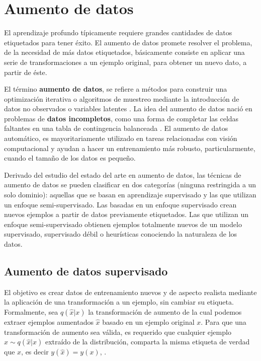 
\section{Aumento de datos}

El aprendizaje profundo típicamente requiere grandes cantidades de datos etiquetados para tener éxito. El aumento de datos promete resolver el problema, de la necesidad de más datos etiquetados, básicamente consiste en aplicar una serie de transformaciones a un ejemplo original, para obtener un nuevo dato, a partir de éste.

El término \textbf{aumento de datos}, se refiere a métodos para construir una optimización iterativa o algoritmos de muestreo mediante la introducción de datos no observados o variables latentes \citep{van2001art}. La idea del aumento de datos nació en problemas de \textbf{datos incompletos}, como una forma de completar las celdas faltantes en una tabla de contingencia balanceada \citep{dempster1977maximum}. El aumento de datos automático, es mayoritariamente utilizado en tareas relacionadas con visión computacional y ayudan a hacer un entrenamiento más robusto, particularmente, cuando el tamaño de los datos es pequeño. 

Derivado del estudio del estado del arte en aumento de datos, las técnicas de aumento de datos se pueden clasificar en dos categorías (ninguna restringida a un solo dominio): aquellas que se basan en aprendizaje supervisado y las que utilizan un enfoque semi-supervisado. Las basadas en un enfoque supervisado crean nuevos ejemplos a partir de datos previamente etiquetados. Las que utilizan un enfoque semi-supervisado obtienen ejemplos totalmente nuevos de un modelo supervisado, supervisado débil o heurísticas conociendo la naturaleza de los datos.


\subsection{Aumento de datos supervisado} El objetivo es crear datos de entrenamiento nuevos y de aspecto realista mediante la aplicación de una transformación a un ejemplo, sin cambiar su etiqueta. Formalmente, sea $q(\hat{x}|x)$ la transformación de aumento de la cual podemos extraer ejemplos aumentados $\hat{x}$ basado en un ejemplo original $x$. Para que una transformación de aumento sea válida, es requerido que cualquier ejemplo $\hat{x} \sim q(\hat{x}|x)$ extraído de la distribución, comparta la misma etiqueta de verdad que $x$, es decir $y(\hat{x})=y(x)$, \citep{xie2019unsupervised}.

